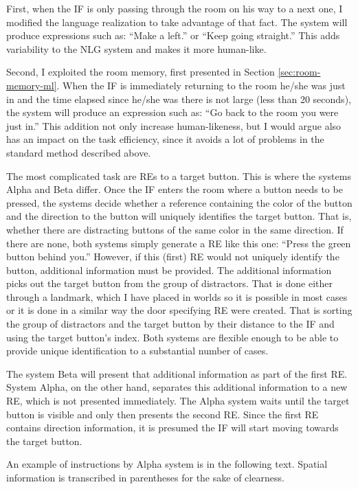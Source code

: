 First, when the IF is only passing through the room on his way to a next one, I modified the language realization to take advantage of that fact. The system will produce expressions such as: ``Make a left.'' or ``Keep going straight.'' This adds variability to the NLG system and makes it more human-like.

Second, I exploited the room memory, first presented in Section \ref{sec:room-memory-ml}. When the IF is immediately returning to the room he/she was just in and the time elapsed since he/she was there is not large (less than 20 seconds), the system will produce an expression such as: ``Go back to the room you were just in.'' This addition not only increase human-likeness, but I would argue also has an impact on the task efficiency, since it avoids a lot of problems in the standard method described above.

The most complicated task are REs to a target button. This is where the systems Alpha and Beta differ. Once the IF enters the room where a button needs to be pressed, the systems decide whether a reference containing the color of the button and the direction to the button will uniquely identifies the target button. That is, whether there are distracting buttons of the same color in the same direction. If there are none, both systems simply generate a RE like this one: ``Press the green button behind you.'' However, if this (first) RE would not uniquely identify the button, additional information must be provided. The additional information picks out the target button from the group of distractors. That is done either through a landmark, which I have placed in worlds so it is possible in most cases or it is done in a similar way the door specifying RE were created. That is sorting the group of distractors and the target button by their distance to the IF and using the target button's index. Both systems are flexible enough to be able to provide unique identification to a substantial number of cases.

The system Beta will present that additional information as part of the first RE. System Alpha, on the other hand, separates this additional information to a new RE, which is not presented immediately. The Alpha system waits until the target button is visible and only then presents the second RE. Since the first RE contains direction information, it is presumed the IF will start moving towards the target button.

An example of instructions by Alpha system is in the following text. Spatial information is transcribed in parentheses for the sake of clearness.

